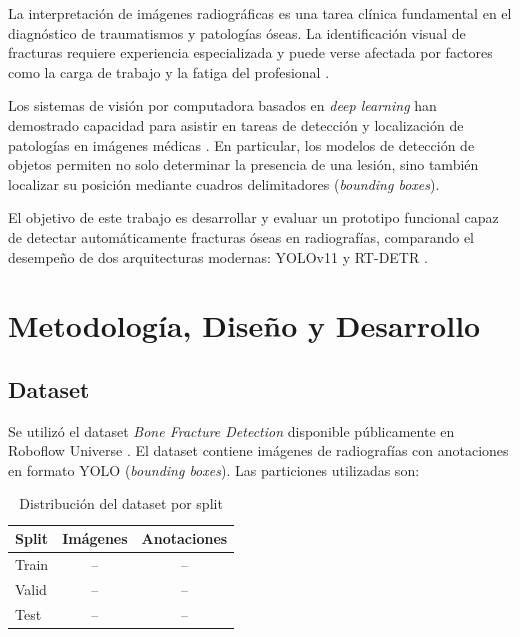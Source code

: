 \documentclass[conference]{IEEEtran}
\begin{document}
La interpretación de imágenes radiográficas es una tarea clínica fundamental en
el diagnóstico de traumatismos y patologías óseas. La identificación visual de
fracturas requiere experiencia especializada y puede verse afectada por factores
como la carga de trabajo y la fatiga del profesional \cite{b1}.

Los sistemas de visión por computadora basados en \textit{deep learning} han
demostrado capacidad para asistir en tareas de detección y localización de
patologías en imágenes médicas \cite{b2}. En particular, los modelos de
detección de objetos permiten no solo determinar la presencia de una lesión,
sino también localizar su posición mediante cuadros delimitadores
(\textit{bounding boxes}).


El objetivo de este trabajo es desarrollar y evaluar un prototipo funcional
capaz de detectar automáticamente fracturas óseas en radiografías, comparando
el desempeño de dos arquitecturas modernas: YOLOv11 \cite{b3} y RT-DETR \cite{b4}.

\section{Metodología, Diseño y Desarrollo}

\subsection{Dataset}

Se utilizó el dataset \textit{Bone Fracture Detection} disponible públicamente
en Roboflow Universe \cite{b5}. El dataset contiene imágenes de radiografías con
anotaciones en formato YOLO (\textit{bounding boxes}). Las particiones utilizadas
son:

\begin{table}[htbp]
\caption{Distribución del dataset por split}
\begin{center}
\begin{tabular}{lcc}
\toprule
\textbf{Split} & \textbf{Imágenes} & \textbf{Anotaciones} \\
\midrule
Train & -- & -- \\  %
Valid & -- & -- \\
Test  & -- & -- \\
\bottomrule
\end{tabular}
\end{center}
\end{table}
\end{document}
